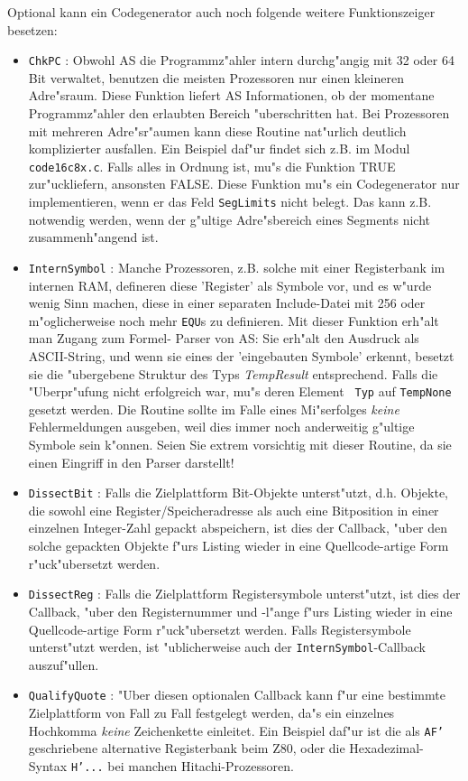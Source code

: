 \documentclass[12pt,a4paper,twoside]{report}
\newcommand{\tty}[1]{{\tt #1}}
\begin{document}
Optional kann ein Codegenerator auch noch folgende weitere Funktionszeiger
besetzen:
\begin{itemize}
\item{\tty{ChkPC} : Obwohl AS die Programmz"ahler intern durchg"angig mit
      32 oder 64 Bit verwaltet, benutzen die meisten Prozessoren nur einen
      kleineren Adre"sraum.  Diese Funktion liefert AS Informationen, ob
      der momentane Programmz"ahler den erlaubten Bereich "uberschritten
      hat.  Bei Prozessoren mit mehreren Adre"sr"aumen kann diese Routine
      nat"urlich deutlich komplizierter ausfallen.  Ein Beispiel daf"ur
      findet sich z.B. im Modul \tty{code16c8x.c}.  Falls alles in Ordnung ist,
      mu"s die Funktion TRUE zur"uckliefern, ansonsten FALSE.
      Diese Funktion mu"s ein Codegenerator nur implementieren, wenn er
      das Feld {\tt SegLimits} nicht belegt.  Das kann z.B. notwendig
      werden, wenn der g"ultige Adre"sbereich eines Segments nicht
      zusammenh"angend ist.}
\item{\tty{InternSymbol} : Manche Prozessoren, z.B. solche mit einer
      Registerbank im internen RAM, defineren diese 'Register' als Symbole
      vor, und es w"urde wenig Sinn machen, diese in einer separaten
      Include-Datei mit 256 oder m"oglicherweise noch mehr {\tt EQU}s
      zu definieren.  Mit dieser Funktion erh"alt man Zugang zum Formel-
      Parser von AS: Sie erh"alt den Ausdruck als ASCII-String, und wenn
      sie eines der 'eingebauten Symbole' erkennt, besetzt sie die
      "ubergebene Struktur des Typs {\em TempResult} entsprechend.  Falls
      die "Uberpr"ufung nicht erfolgreich war, mu"s deren Element {\tt
      Typ} auf {\tt TempNone} gesetzt werden.  Die Routine sollte im
      Falle eines Mi"serfolges {\em keine} Fehlermeldungen ausgeben, weil
      dies immer noch anderweitig g"ultige Symbole sein k"onnen.  Seien
      Sie extrem vorsichtig mit dieser Routine, da sie einen Eingriff in
      den Parser darstellt!}
\item{\tty{DissectBit} : Falls die Zielplattform Bit-Objekte unterst"utzt,
      d.h. Objekte, die sowohl eine Register/Speicheradresse als auch eine
      Bitposition in einer einzelnen Integer-Zahl gepackt abspeichern, ist
      dies der Callback, "uber den solche gepackten Objekte f"urs Listing
      wieder in eine Quellcode-artige Form r"uck"ubersetzt werden.}
\item{\tty{DissectReg} : Falls die Zielplattform Registersymbole unterst"utzt,
      ist dies der Callback, "uber den Registernummer und -l"ange f"urs Listing
      wieder in eine Quellcode-artige Form r"uck"ubersetzt werden.
      Falls Registersymbole unterst"utzt werden, ist "ublicherweise auch
      der \tty{InternSymbol}-Callback auszuf"ullen.}
\item{\tty{QualifyQuote} : "Uber diesen optionalen Callback kann f"ur
      eine bestimmte Zielplattform von Fall zu Fall festgelegt werden, da"s
      ein einzelnes Hochkomma {\em keine} Zeichenkette einleitet.  Ein
      Beispiel daf"ur ist die als \tty{AF'} geschriebene alternative
      Registerbank beim Z80, oder die Hexadezimal-Syntax \tty{H'...} bei
      manchen Hitachi-Prozessoren.}
\end{itemize}
\end{document}
